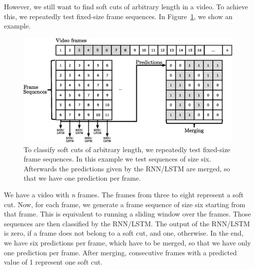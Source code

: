 However, we still want to find soft cuts of arbitrary length in a video.
To achieve this, we repeatedly test fixed-size frame sequences.
In Figure~\ref{fig:soft_cut_approach}, we show an example.
\begin{figure}[!htb]
	\centering
	\includegraphics[scale=.7]{images/soft_cut_approach.eps}
	\caption{To classify soft cuts of arbitrary length, we repeatedly test fixed-size frame sequences. In this example we test sequences of size six. Afterwards the predictions given by the RNN/LSTM are merged, so that we have one prediction per frame.}
	\label{fig:soft_cut_approach}
\end{figure}
We have a video with \textit{n} frames.
The frames from three to eight represent a soft cut.
Now, for each frame, we generate a frame sequence of size six starting from that frame.
This is equivalent to running a sliding window over the frames.
Those sequences are then classified by the RNN/LSTM.
The output of the RNN/LSTM is zero, if a frame does not belong to a soft cut, and one, otherwise.
In the end, we have six predictions per frame, which have to be merged, so that we have only one prediction per frame.
After merging, consecutive frames with a predicted value of 1 represent one soft cut.

